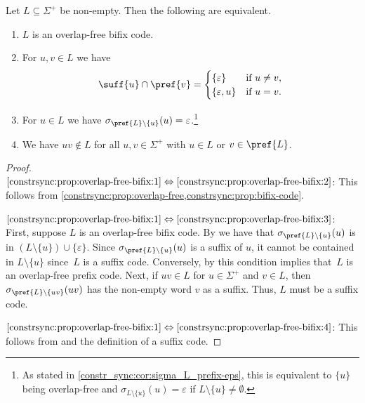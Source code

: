 \begin{proposition} \label{constrsync:prop:overlap-free-bifix}
	Let $L \subseteq \Sigma^+$ be non-empty. Then the following are equivalent.	
	\begin{enumerate}
		
		\item \label{constrsync:prop:overlap-free-bifix:1} $L$ is an overlap-free bifix code.
		
		\item \label{constrsync:prop:overlap-free-bifix:2} For $u,v \in L$ we have
		\[
		\suff{u} \cap \pref{v} = \begin{cases}
			\{\varepsilon\} & \text{if } u \ne v, \\
			\{\varepsilon, u\} & \text{if } u = v.	
		\end{cases}
		\]
		
		\item \label{constrsync:prop:overlap-free-bifix:3} For $u \in L$ we have $\sigma_{\pref{L}\setminus\{u\}}(u) = \varepsilon$.\footnote{As stated
			in \cref{constr_sync:cor:sigma_L_prefix-eps},
			this is equivalent to $\{u\}$ being overlap-free
			and $\sigma_{L\setminus\{u\}}(u) = \varepsilon$
			if $L \setminus \{u\} \ne \emptyset$.}

		\item \label{constrsync:prop:overlap-free-bifix:4} 
		We have $uv \notin L$ for all $u,v \in \Sigma^+$ with $u \in L$ or $v \in \pref{L}$.
	\end{enumerate}
\end{proposition}
\begin{proof}
$\ref{constrsync:prop:overlap-free-bifix:1} \Leftrightarrow \ref{constrsync:prop:overlap-free-bifix:2}$: This follows from \cref{constrsync:prop:overlap-free,constrsync:prop:bifix-code}.

$\ref{constrsync:prop:overlap-free-bifix:1} \Leftrightarrow \ref{constrsync:prop:overlap-free-bifix:3}$:
First, suppose $L$ is an overlap-free bifix code.
By 
we have that $\sigma_{\pref{L}\setminus\{u\}}(u)$ is in $( L \setminus \{u\} ) \cup \{\varepsilon\}$.
Since $\sigma_{\pref{L}\setminus\{u\}}(u)$ is a suffix of $u$, 
it cannot be contained in $L \setminus \{u\}$ since~$L$ is a suffix code.
Conversely, by 
this condition implies that~$L$ is an overlap-free prefix code.
Next, if $uv \in L$ for $u \in \Sigma^+$ and $v \in L$,
then $\sigma_{\pref{L}\setminus\{uv\}}(uv)$ has the non-empty word $v$ as a suffix.
Thus, $L$ must be a suffix code.

$\ref{constrsync:prop:overlap-free-bifix:1} \Leftrightarrow \ref{constrsync:prop:overlap-free-bifix:4}$: 
This follows from 
and the definition of a suffix code.
\end{proof}

